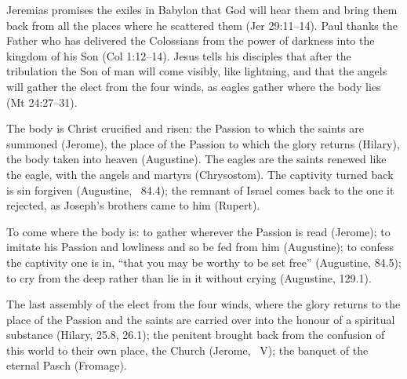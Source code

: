 \begin{fourSenses}
\item[Literal.] Jeremias promises the exiles in Babylon that God will hear them
and bring them back from all the places where he scattered them (Jer
29:11--14). Paul thanks the Father who has delivered the Colossians from the
power of darkness into the kingdom of his Son (Col 1:12--14). Jesus tells his
disciples that after the tribulation the Son of man will come visibly, like
lightning, and that the angels will gather the elect from the four winds, as
eagles gather where the body lies (Mt 24:27--31).
\item[Allegorical.] The body is Christ crucified and risen: the Passion to
which the saints are summoned (Jerome), the place of the Passion to which the
glory returns (Hilary), the body taken into heaven (Augustine). The eagles are
the saints renewed like the eagle, with the angels and martyrs (Chrysostom).
The captivity turned back is sin forgiven (Augustine, ~84.4);
the remnant of Israel comes back to the one it rejected, as Joseph's brothers
came to him (Rupert).
\item[Moral.] To come where the body is: to gather wherever the Passion is read
(Jerome); to imitate his Passion and lowliness and so be fed from him
(Augustine); to confess the captivity one is in, ``that you may be worthy to
be set free'' (Augustine, 84.5); to cry from the deep rather than lie in it
without crying (Augustine, 129.1).
\item[Anagogical.] The last assembly of the elect from the four winds, where
the glory returns to the place of the Passion and the saints are carried over
into the honour of a spiritual substance (Hilary, 25.8, 26.1); the penitent
brought back from the confusion of this world to their own place, the Church
(Jerome, ~V); the banquet of the eternal Pasch
(Fromage).
\end{fourSenses}
